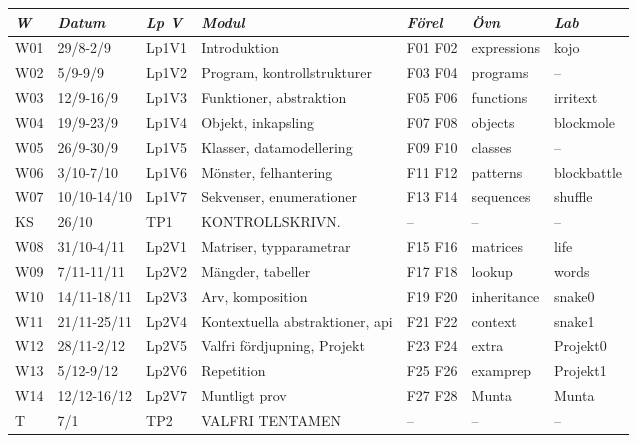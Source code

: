 \begin{tabular}{l|l|l|l|l|l|l}
\textit{W} & \textit{Datum} & \textit{Lp V} & \textit{Modul} & \textit{Förel} & \textit{Övn} & \textit{Lab} \\ \hline \hline
W01 & 29/8-2/9 & Lp1V1 & Introduktion & F01 F02 & expressions & kojo \\
W02 & 5/9-9/9 & Lp1V2 & Program, kontrollstrukturer & F03 F04 & programs & -- \\
W03 & 12/9-16/9 & Lp1V3 & Funktioner, abstraktion & F05 F06 & functions & irritext \\
W04 & 19/9-23/9 & Lp1V4 & Objekt, inkapsling & F07 F08 & objects & blockmole \\
W05 & 26/9-30/9 & Lp1V5 & Klasser, datamodellering & F09 F10 & classes & -- \\
W06 & 3/10-7/10 & Lp1V6 & Mönster, felhantering & F11 F12 & patterns & blockbattle \\
W07 & 10/10-14/10 & Lp1V7 & Sekvenser, enumerationer & F13 F14 & sequences & shuffle \\
KS & 26/10 & TP1 & KONTROLLSKRIVN. & -- & -- & -- \\
W08 & 31/10-4/11 & Lp2V1 & Matriser, typparametrar & F15 F16 & matrices & life \\
W09 & 7/11-11/11 & Lp2V2 & Mängder, tabeller & F17 F18 & lookup & words \\
W10 & 14/11-18/11 & Lp2V3 & Arv, komposition & F19 F20 & inheritance & snake0 \\
W11 & 21/11-25/11 & Lp2V4 & Kontextuella abstraktioner, api & F21 F22 & context & snake1 \\
W12 & 28/11-2/12 & Lp2V5 & Valfri fördjupning, Projekt & F23 F24 & extra & Projekt0 \\
W13 & 5/12-9/12 & Lp2V6 & Repetition & F25 F26 & examprep & Projekt1 \\
W14 & 12/12-16/12 & Lp2V7 & Muntligt prov & F27 F28 & Munta & Munta \\
T & 7/1 & TP2 & VALFRI TENTAMEN & -- & -- & -- \\
\end{tabular}
